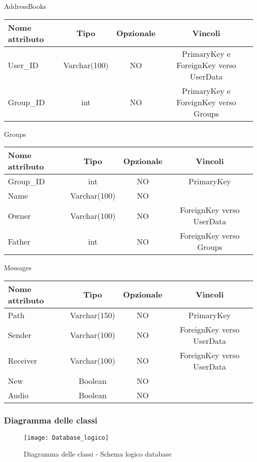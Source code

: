 \begin{center}
AddressBooks

\begin{center}
\begin{tabular}{lccc}
\toprule
Nome attributo & Tipo & Opzionale & Vincoli\\
\midrule %
User\_ID & Varchar(100) & NO & PrimaryKey e ForeignKey verso UserData\\
Group\_ID & int & NO & PrimaryKey e ForeignKey verso Groups\\
\bottomrule
\end{tabular}
\end{center}

Groups

\begin{center}
\begin{tabular}{lccc}
\toprule
Nome attributo & Tipo & Opzionale & Vincoli\\
\midrule %
Group\_ID & int & NO & PrimaryKey\\
Name & Varchar(100) & NO & \\
Owner & Varchar(100) & NO & ForeignKey verso UserData\\
Father & int & NO & ForeignKey verso Groups\\
\bottomrule
\end{tabular}
\end{center}	

Messages

\begin{center}
\begin{tabular}{lccc}
\toprule
Nome attributo & Tipo & Opzionale & Vincoli\\
\midrule %
Path & Varchar(150) & NO & PrimaryKey\\
Sender & Varchar(100) & NO & ForeignKey verso UserData \\
Receiver & Varchar(100) & NO & ForeignKey verso UserData\\
New & Boolean & NO & \\
Audio & Boolean & NO & \\
\bottomrule
\end{tabular}	
\end{center}

\end{center}

\subsubsection{Diagramma delle classi}
\begin{figure}[H]
\begin{center}
\texttt{[image: Database\_logico]}
\caption{Diagramma delle classi - Schema logico database}\label{fig:database_logico}
\end{center}
\end{figure}

